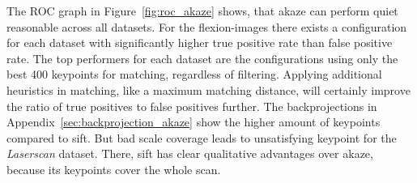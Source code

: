 The \acrshort{ROC} graph in Figure~\ref{fig:roc_akaze} shows, that \acrshort{akaze} can perform quiet reasonable across all datasets.
For the \glspl{flexion-image} there exists a configuration for each dataset with significantly higher true positive rate than false positive rate.
The top performers for each dataset are the configurations using only the best 400 keypoints for matching, regardless of filtering.
Applying additional heuristics in matching, like a maximum matching distance, will certainly improve the ratio of true positives to false positives further.
The backprojections in Appendix~\ref{sec:backprojection_akaze} show the higher amount of keypoints compared to \acrshort{sift}.
But bad scale coverage leads to unsatisfying keypoint for the \emph{Laserscan} dataset.
There, \acrshort{sift} has clear qualitative advantages over \acrshort{akaze}, because its keypoints cover the whole scan.
